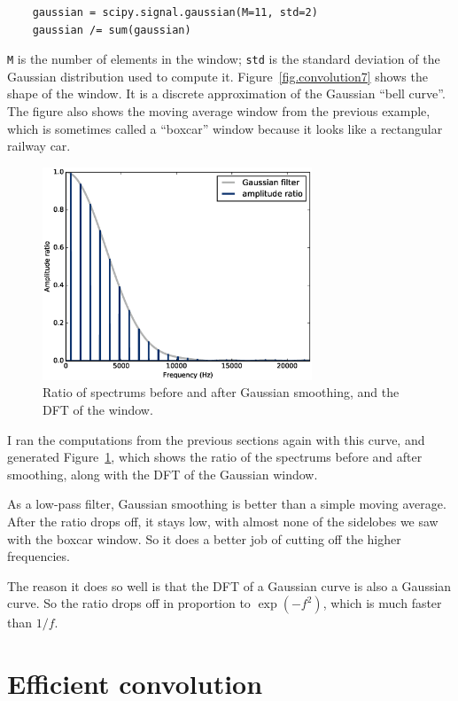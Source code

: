 \documentclass[12pt]{book}
\begin{document}
\begin{verbatim}
    gaussian = scipy.signal.gaussian(M=11, std=2)
    gaussian /= sum(gaussian)
\end{verbatim}

{\tt M} is the number of elements in the window; {\tt std}
is the standard deviation of the Gaussian distribution used to
compute it.  Figure~\ref{fig.convolution7} shows the shape
of the window.  It is a discrete approximation of the Gaussian
``bell curve''.  The figure also shows the moving average window
from the previous example, which is sometimes called a
``boxcar'' window because it looks like a rectangular railway car.

\begin{figure}
\centerline{\includegraphics[height=2.5in]{figs/convolution8.eps}}
\caption{Ratio of spectrums before and after Gaussian smoothing, and
  the DFT of the window.}
\label{fig.convolution8}
\end{figure}

I ran the computations from the previous sections again
with this curve, and generated Figure~\ref{fig.convolution8},
which shows the ratio of the spectrums before and after
smoothing, along with the DFT of the Gaussian window. 

As a low-pass filter, Gaussian smoothing is better than a simple
moving average.  After the ratio drops off, it stays low, with almost
none of the sidelobes we saw with the boxcar window.  So it does a
better job of cutting off the higher frequencies.

The reason it does so well is that the DFT of a Gaussian curve is also a
Gaussian curve.  So the ratio drops off in proportion to $\exp(-f^2)$,
which is much faster than $1/f$.


\section{Efficient convolution}
\label{effconv}
\end{document}
